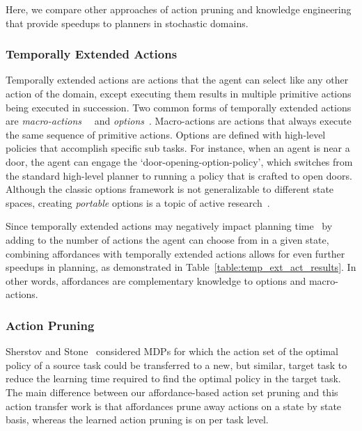 \documentclass[letterpaper]{article}
\begin{document}
Here, we compare other approaches of action pruning and
knowledge engineering that provide speedups to planners
in stochastic domains.

\subsubsection{Temporally Extended Actions}
Temporally extended actions are actions that the agent can select like
any other action of the domain, except executing them results in
multiple primitive actions being executed in succession. Two common
forms of temporally extended actions are {\em
  macro-actions}~\cite{hauskrecht98} ~and {\em
  options}~\cite{sutton99}.  Macro-actions are actions that always
execute the same sequence of primitive actions. Options are defined
with high-level policies that accomplish specific sub tasks. For
instance, when an agent is near a door, the agent can engage the
`door-opening-option-policy', which switches from the standard
high-level planner to running a policy that is crafted to open
doors.  Although the classic options framework is not generalizable to
different state spaces, creating {\em portable} options is a topic of
active
research~\cite{konidaris07,konidaris2009efficient,Ravindran03analgebraic,croonenborghs2008learning,andre2002state,konidaris2012transfer}.

Since temporally extended actions may negatively impact planning
time~\cite{Jong:2008zr} by adding to the number of actions the agent
can choose from in a given state, combining affordances with
temporally extended actions allows for even further speedups in
planning, as demonstrated in Table~\ref{table:temp_ext_act_results}. In
other words, affordances are complementary knowledge to options and
macro-actions.

\subsubsection{Action Pruning}

Sherstov and Stone~\cite{sherstov2005improving} considered MDPs 
for which the action set of the optimal
policy of a source task could be transferred to a new, but similar,
target task to reduce the learning time required to find the optimal
policy in the target task. The main difference between our
affordance-based action set pruning and this action transfer work is
that affordances prune away actions on a state by state basis, whereas
the learned action pruning is on per task level.
\end{document}
